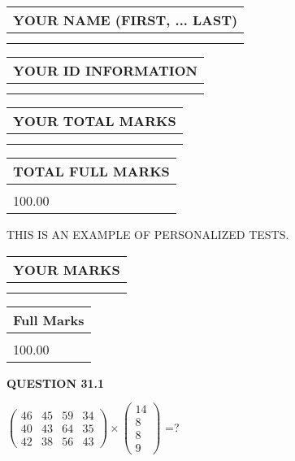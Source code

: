 \documentclass[12pt]{article}
\begin{document}
   
   
   
\noindent\begin{tabular}{|l|}
\hline
YOUR NAME (FIRST, ... LAST)  \\
\hline
 \\ 
 \\ 
\hline
\end{tabular}
\hspace{0.05in} \begin{tabular}{|l|}
\hline
 YOUR   ID   INFORMATION  \\
\hline
 \\ 
 \\ 
\hline
\end{tabular}
   
   
\vspace{0.2in}\noindent\begin{tabular}{|l|}
\hline
YOUR TOTAL MARKS  \\
\hline
 \\ 
 \\ 
\hline
\end{tabular}
\hspace{0.05in} \begin{tabular}{|l|}
\hline
TOTAL FULL MARKS  \\
\hline
 \\ 
100.00 \\
\hline
\end{tabular}
   
   
 \vspace{0.2in}
{\Huge  THIS IS AN EXAMPLE OF}
{\Huge  PERSONALIZED TESTS. }
   
   
  
\vspace{0.2in}
  
\noindent\begin{tabular}{|l|}
\hline
 YOUR MARKS  \\
\hline
 \\ 
 \\ 
\hline
\end{tabular}
\hspace{0.05in} \begin{tabular}{|l|}
\hline
 Full Marks  \\
\hline
 \\ 
100.00 \\
\hline
\end{tabular}
{\textbf{\Large{QUESTION
31.1 
}}}
  
  
 
$ \left( \begin{array}{ccccccccc}
          46  & 
          45  & 
          59  & 
          34  \\ 
          40  & 
          43  & 
          64  & 
          35  \\ 
          42  & 
          38  & 
          56  & 
          43
\end{array}\right) \times
\left( \begin{array}{c}
          14  \\ 
           8  \\ 
           8  \\ 
           9
\end{array}\right) $ =?
 
\end{document}
